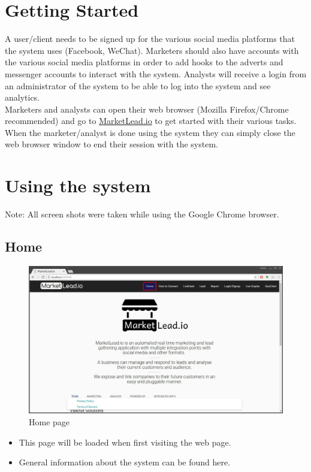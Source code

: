 \documentclass{article}
\begin{document}
	\section{Getting Started}
		A user/client needs to be signed up for the various social media platforms that the system uses (Facebook, WeChat).
		Marketers should also have accounts with the various social media platforms in order to add hooks to the adverts and messenger accounts to interact with the system.
		Analysts will receive a login from an administrator of the system to be able to log into the system and see analytics.\\
		Marketers and analysts can open their web browser (Mozilla Firefox/Chrome recommended) and go to \href{https://insuranceprofiling.herokuapp.com}{MarketLead.io} to get started with their various tasks.
		When the marketer/analyst is done using the system they can simply close the web browser window to end their session with the system.

	\section{Using the system}
		Note: All screen shots were taken while using the Google Chrome browser.
		\subsection{Home}
			\begin{figure}[H]
				\includegraphics[width=\textwidth]{images/home.jpg}
				\caption{Home page}
			\end{figure}

			\begin{itemize}
				\item This page will be loaded when first visiting the web page.
				\item General information about the system can be found here.
			\end{itemize}
\end{document}
